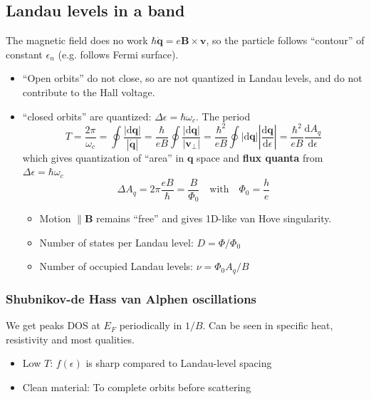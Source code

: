 \documentclass[11pt,letterpaper]{article}
\numberwithin{equation}{section} %
\renewcommand*{\vec}[1]{\bm{#1}}
\newcommand{\dif}{\mathrm d}
\begin{document}
\subsection{Landau levels in a band}
\label{sub:landau_levels_in_a_band}
The magnetic field does no work $\hbar\dot{\vec{q}} = e\vec B\times\vec v$, so
the particle follows ``contour'' of constant $\epsilon_n$ (e.g. follows Fermi surface). 
\begin{itemize}
  \item ``Open orbits'' do not close, so are not quantized in Landau levels,
	  and do not contribute to the Hall voltage. 
  \item ``closed orbits'' are quantized: $\Delta \epsilon = \hbar \omega_c$. 
	  The period 
	  \begin{equation}
		  T = \frac{2\pi}{\omega_c} = \oint\frac{|\dif\vec q|}{|\dot{\vec{q}}|}
		  = \frac{\hbar}{e B}\oint\frac{|\dif\vec q|}{|\vec v_\perp|}
		  = \frac{\hbar^2}{eB}\oint|\dif \vec q|\left|\frac{\dif\vec
		  q}{\dif\epsilon}\right| 
		  = \frac{\hbar^2}{eB}\frac{\dif A_q}{\dif\epsilon}
	  \end{equation}
	  which gives quantization of ``area'' in $\vec q$ space and \textbf{flux
	  quanta} from $\Delta \epsilon = \hbar\omega_c$
	  \begin{equation}
		  \Delta A_q = 2\pi\frac{eB}{\hbar} = \frac{B}{\Phi_0} 
		  \mbox{~~~with~~~}
		  \Phi_0 = \frac he
	  \end{equation}
	  \begin{itemize}
	    \item Motion $\parallel \vec B$ remains ``free'' and gives 1D-like
			van Hove singularity. 
		\item Number of states per Landau level: $D = \Phi/\Phi_0$
		\item Number of occupied Landau levels: $\nu = \Phi_0 A_q/B$
	  \end{itemize}
\end{itemize}

\subsubsection{Shubnikov-de Hass van Alphen oscillations}
\label{ssub:Shubnikov-de Hass van Alphen oscillations}
We get peaks DOS at $E_F$ periodically in $1/B$. Can be seen in specific
heat, resistivity and most qualities.
\begin{itemize}
  \item Low $T$: $f(\epsilon)$ is sharp compared to Landau-level spacing
  \item Clean material: To complete orbits before scattering
\end{itemize}
\end{document}
